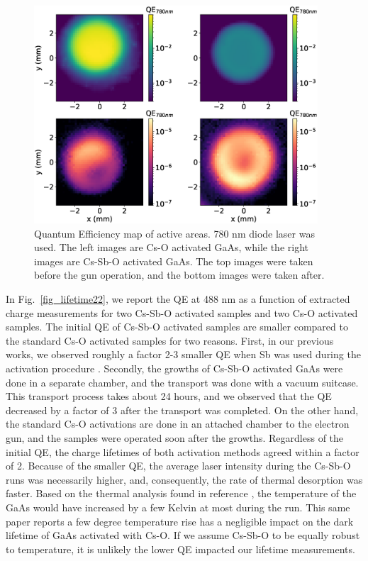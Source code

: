 \begin{figure}
	\centering
	\includegraphics*[width=300pt]{figs/heracles/map.eps}
	\caption{Quantum Efficiency map of active areas. 780 nm diode laser was used. The left images are Cs-O activated GaAs, while the right images are Cs-Sb-O activated GaAs. The top images were taken before the gun operation, and the bottom images were taken after.}
	\label{fig_map22}
\end{figure}

In Fig.~\ref{fig_lifetime22}, we report the QE at 488 nm as a function of extracted charge measurements for two Cs-Sb-O activated samples and two Cs-O activated samples.
The initial QE of Cs-Sb-O activated samples are smaller compared to the standard Cs-O activated samples for two reasons. First, in our previous works, we observed roughly a factor 2-3 smaller QE when Sb was used during the activation procedure \cite{cultrera2020_LongLifetimePolarized}.
Secondly, the growths of Cs-Sb-O activated GaAs were done in a separate chamber, and the transport was done with a vacuum suitcase. This transport process takes about 24 hours, and we observed that the QE decreased by a factor of 3 after the transport was completed. On the other hand, the standard Cs-O activations are done in an attached chamber to the electron gun, and the samples were operated soon after the growths.
Regardless of the initial QE, the charge lifetimes of both activation methods agreed within a factor of 2.
Because of the smaller QE, the average laser intensity during the Cs-Sb-O runs was necessarily higher, and, consequently, the rate of thermal desorption was faster. Based on the thermal analysis found in reference \cite{kuriki2011_DarklifetimeDegradationGaAs}, the temperature of the GaAs would have increased by a few Kelvin at most during the run. This same paper reports a few degree temperature rise has a negligible impact on the dark lifetime of GaAs activated with Cs-O. If we assume Cs-Sb-O to be equally robust to temperature, it is unlikely the lower QE impacted our lifetime measurements.

